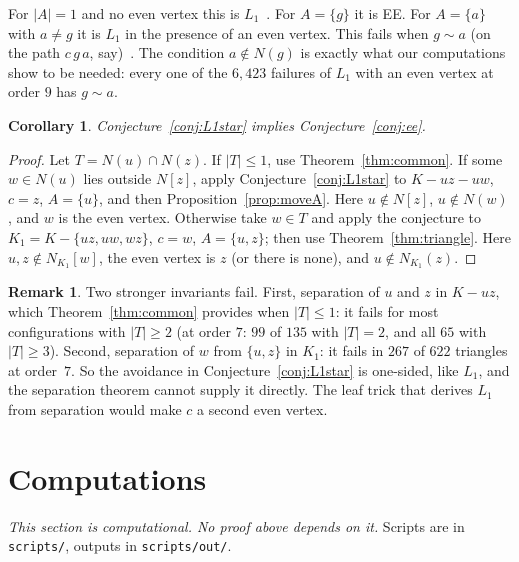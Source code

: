 \documentclass[11pt]{amsart}
\newtheorem{corollary}[theorem]{Corollary}
\theoremstyle{definition}
\newtheorem{remark}[theorem]{Remark}
\begin{document}
For $|A|=1$ and no even vertex this is $L_1$~\cite[Theorem~6.3]{RD}. For $A=\{g\}$ it is EE. For
$A=\{a\}$ with $a\ne g$ it is $L_1$ in the presence of an even vertex. This fails when $g\sim a$ (on the
path $c\,g\,a$, say)~\cite[Remark~6.7]{RD}. The condition $a\notin N(g)$ is exactly what our
computations show to be needed: every one of the $6{,}423$ failures of $L_1$ with an even vertex at
order $9$ has $g\sim a$.

\begin{corollary}\label{cor:EEfromL1}
Conjecture~\ref{conj:L1star} implies Conjecture~\ref{conj:ee}.
\end{corollary}

\begin{proof}
Let $T=N(u)\cap N(z)$. If $|T|\le1$, use Theorem~\ref{thm:common}. If some $w\in N(u)$ lies outside
$N[z]$, apply Conjecture~\ref{conj:L1star} to $K-uz-uw$, $c=z$, $A=\{u\}$, and then
Proposition~\ref{prop:moveA}. Here $u\notin N[z]$, $u\notin N(w)$, and $w$ is the even vertex.
Otherwise take $w\in T$ and apply the conjecture to $K_1=K-\{uz,uw,wz\}$, $c=w$, $A=\{u,z\}$; then use
Theorem~\ref{thm:triangle}. Here $u,z\notin N_{K_1}[w]$, the even vertex is $z$ (or there is none),
and $u\notin N_{K_1}(z)$.
\end{proof}

\begin{remark}
Two stronger invariants fail. First, separation of $u$ and $z$ in $K-uz$, which Theorem~\ref{thm:common}
provides when $|T|\le1$: it fails for most configurations with $|T|\ge2$ (at order $7$: $99$ of $135$
with $|T|=2$, and all $65$ with $|T|\ge3$). Second, separation of $w$ from $\{u,z\}$ in $K_1$: it fails
in $267$ of $622$ triangles at order~$7$. So the avoidance in Conjecture~\ref{conj:L1star} is one-sided,
like $L_1$, and the separation theorem cannot supply it directly. The leaf trick that derives $L_1$ from
separation would make $c$ a second even vertex.
\end{remark}

\section{Computations}\label{sec:comp}

\emph{This section is computational. No proof above depends on it.} Scripts are in
\texttt{scripts/}, outputs in \texttt{scripts/out/}.
\end{document}
